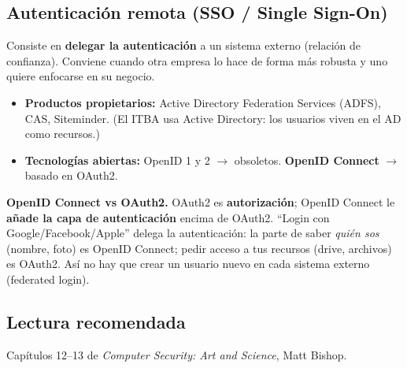 \documentclass[../main.tex]{subfiles}
\begin{document}
\subsection{Autenticación remota (SSO / Single Sign-On)}

Consiste en \textbf{delegar la autenticación} a un sistema externo (relación de confianza). Conviene cuando otra empresa lo hace de forma más robusta y uno quiere enfocarse en su negocio.

\begin{itemize}[itemsep=1pt]
  \item \textbf{Productos propietarios:} Active Directory Federation Services (ADFS), CAS, Siteminder. (El ITBA usa Active Directory: los usuarios viven en el AD como recursos.)
  \item \textbf{Tecnologías abiertas:} OpenID 1 y 2 $\to$ obsoletos. \textbf{OpenID Connect} $\to$ basado en OAuth2.
\end{itemize}

\begin{destacado}
\textbf{OpenID Connect vs OAuth2.} OAuth2 es \textbf{autorización}; OpenID Connect le \textbf{añade la capa de autenticación} encima de OAuth2. ``Login con Google/Facebook/Apple'' delega la autenticación: la parte de saber \emph{quién sos} (nombre, foto) es OpenID Connect; pedir acceso a tus recursos (drive, archivos) es OAuth2. Así no hay que crear un usuario nuevo en cada sistema externo (federated login).
\end{destacado}

\subsection{Lectura recomendada}
Capítulos 12--13 de \emph{Computer Security: Art and Science}, Matt Bishop.
\end{document}
